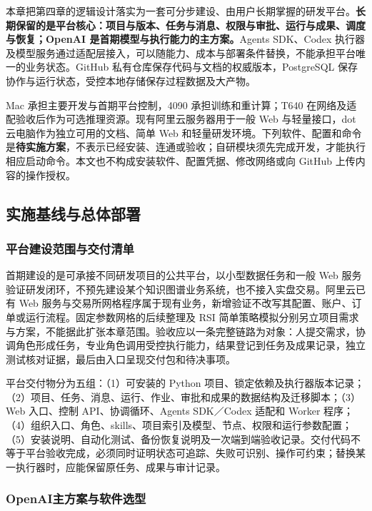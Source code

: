 \documentclass[11pt,a4paper]{article}
\begin{document}
本章把第四章的逻辑设计落实为一套可分步建设、由用户长期掌握的研发平台。\textbf{长期保留的是平台核心：项目与版本、任务与消息、权限与审批、运行与成果、调度与恢复；OpenAI 是首期模型与执行能力的主方案。}Agents SDK、Codex 执行器及模型服务通过适配层接入，可以随能力、成本与部署条件替换，不能承担平台唯一的业务状态。GitHub 私有仓库保存代码与文档的权威版本，PostgreSQL 保存协作与运行状态，受控本地存储保存过程数据及大产物。

Mac 承担主要开发与首期平台控制，4090 承担训练和重计算；T640 在网络及适配验收后作为可选推理资源。现有阿里云服务器用于一般 Web 与轻量接口，dot 云电脑作为独立可用的文档、简单 Web 和轻量研发环境。下列软件、配置和命令是\textbf{待实施方案}，不表示已经安装、连通或验收；自研模块须先完成开发，才能执行相应启动命令。本文也不构成安装软件、配置凭据、修改网络或向 GitHub 上传内容的操作授权。

\subsection{实施基线与总体部署}

\subsubsection{平台建设范围与交付清单}

首期建设的是可承接不同研发项目的公共平台，以小型数据任务和一般 Web 服务验证研发闭环，不预先建设某个知识图谱业务系统，也不接入实盘交易。阿里云已有 Web 服务与交易所网格程序属于现有业务，新增验证不改写其配置、账户、订单或运行流程。固定参数网格的后续整理及 RSI 简单策略模拟分别另立项目需求与方案，不能据此扩张本章范围。验收应以一条完整链路为对象：人提交需求，协调角色形成任务，专业角色调用受控执行能力，结果登记到任务及成果记录，独立测试核对证据，最后由入口呈现交付包和待决事项。

平台交付物分为五组：（1）可安装的 Python 项目、锁定依赖及执行器版本记录；（2）项目、任务、消息、运行、作业、审批和成果的数据结构及迁移脚本；（3）Web 入口、控制 API、协调循环、Agents SDK／Codex 适配和 Worker 程序；（4）组织入口、角色、skills、项目索引及模型、节点、权限和运行参数配置；（5）安装说明、自动化测试、备份恢复说明及一次端到端验收记录。交付代码不等于平台验收完成，必须同时证明状态可追踪、失败可识别、操作可约束；替换某一执行器时，应能保留原任务、成果与审计记录。

\subsubsection{OpenAI主方案与软件选型}
\end{document}
